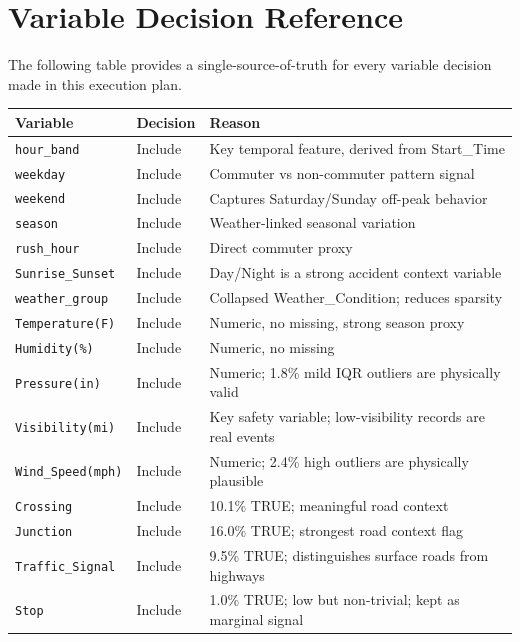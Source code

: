 \documentclass[11pt]{article}
\begin{document}
\section{Variable Decision Reference}

The following table provides a single-source-of-truth for every variable decision made in this execution plan.

\begin{longtable}{|p{4cm}|p{2.5cm}|p{7cm}|}
\hline
\textbf{Variable} & \textbf{Decision} & \textbf{Reason} \\
\hline
\texttt{hour\_band} & Include & Key temporal feature, derived from Start\_Time \\
\hline
\texttt{weekday} & Include & Commuter vs non-commuter pattern signal \\
\hline
\texttt{weekend} & Include & Captures Saturday/Sunday off-peak behavior \\
\hline
\texttt{season} & Include & Weather-linked seasonal variation \\
\hline
\texttt{rush\_hour} & Include & Direct commuter proxy \\
\hline
\texttt{Sunrise\_Sunset} & Include & Day/Night is a strong accident context variable \\
\hline
\texttt{weather\_group} & Include & Collapsed Weather\_Condition; reduces sparsity \\
\hline
\texttt{Temperature(F)} & Include & Numeric, no missing, strong season proxy \\
\hline
\texttt{Humidity(\%)} & Include & Numeric, no missing \\
\hline
\texttt{Pressure(in)} & Include & Numeric; 1.8\% mild IQR outliers are physically valid \\
\hline
\texttt{Visibility(mi)} & Include & Key safety variable; low-visibility records are real events \\
\hline
\texttt{Wind\_Speed(mph)} & Include & Numeric; 2.4\% high outliers are physically plausible \\
\hline
\texttt{Crossing} & Include & 10.1\% TRUE; meaningful road context \\
\hline
\texttt{Junction} & Include & 16.0\% TRUE; strongest road context flag \\
\hline
\texttt{Traffic\_Signal} & Include & 9.5\% TRUE; distinguishes surface roads from highways \\
\hline
\texttt{Stop} & Include & 1.0\% TRUE; low but non-trivial; kept as marginal signal \\

\end{longtable}
\end{document}
